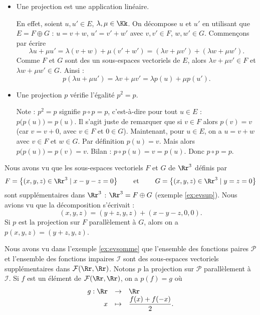 \documentclass[class=report,crop=false]{standalone}
\begin{document}
\begin{itemize}
  \item Une projection est une application linéaire.

En effet, soient $u,u' \in E$, $\lambda,\mu \in \Kk$.
On décompose $u$ et $u'$ en utilisant que $E = F \oplus G$ :
$u=v+w$, $u'=v'+w'$ avec $v,v' \in F$, $w,w' \in G$.
Commençons par écrire
$$\lambda u+ \mu u' = \lambda (v+w) + \mu (v'+w') = (\lambda v+ \mu v') + (\lambda w + \mu w').$$
Comme $F$ et $G$ sont des un sous-espaces vectoriels de $E$, alors
$\lambda v+ \mu v' \in F$ et $\lambda w+ \mu w' \in G$. Ainsi :
$$p(\lambda u+ \mu u')  = \lambda v+ \mu v' = \lambda p(u)+\mu p(u').$$

  \item Une projection $p$ vérifie l'égalité $p^2=p$.

Note : $p^2=p$ signifie $p\circ p = p$, c'est-à-dire pour tout $u\in E$ :
$p\big(p(u)\big) = p(u)$.
Il s'agit juste de remarquer que si $v \in F$ alors $p(v) = v$
(car $v=v+0$, avec $v\in F$ et $0\in G$).
Maintenant, pour $u\in E$, on a $u=v+w$ avec $v \in F$ et $w \in G$.
Par définition $p(u)=v$. Mais alors $p\big(p(u)\big) = p(v)= v$.
Bilan : $p \circ p (u) = v = p(u)$. Donc $p \circ p = p$.
\end{itemize}


\begin{exemple}
Nous avons vu que les sous-espaces vectoriels $F$ et $G$ de $\Rr^3$ définis par
$$F=\big\{ (x,y,z) \in \Rr^3\mid x-y-z=0\big\} \qquad  \text{ et } \qquad
G=\big\{(x,y,z) \in \Rr^3 \mid y=z=0 \big\}$$
sont supplémentaires dans $\Rr^3$ : $\Rr^3 = F \oplus G$ (exemple \ref{ex:evsup}).
Nous avions vu que la décomposition s'écrivait :
$$(x,y,z)=(y+z,y,z)+ (x-y-z, 0,0).$$
Si $p$ est la projection sur $F$ parallèlement à $G$, alors
on a $p(x,y,z)=(y+z,y,z)$.


\end{exemple}

\begin{exemple}
Nous avons vu dans l'exemple \ref{ex:evsomme} que l'ensemble des fonctions paires $\mathcal{P}$ et l'ensemble des fonctions
 impaires $\mathcal{I}$ sont des sous-espaces vectoriels supplémentaires dans $\mathcal{F}(\Rr ,\Rr)$.
Notons $p$ la projection sur $\mathcal{P}$ parallèlement à $\mathcal{I}$. Si $f$ est un élément de
$\mathcal{F}(\Rr ,\Rr)$, on a $p(f)=g$ où
$$\begin{array}{rcl}
g : \Rr & \to & \Rr \\
x & \mapsto &
{\displaystyle \frac{f(x)+f(-x)}2}.
\end{array}$$
 \end{exemple}
\end{document}
